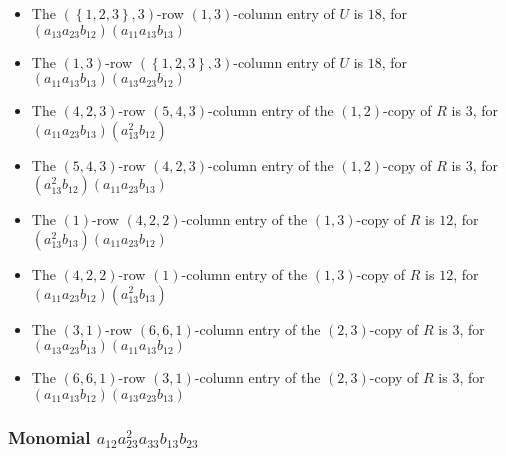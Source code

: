 \documentclass{article}
\begin{document}
\begin{itemize}
\item The $ \left(\left\{1, 2, 3\right\}, 3\right) $-row $ \left(1, 3\right) $-column entry of $U$ is $ 18 $, for $( a_{13} a_{23} b_{12} )( a_{11} a_{13} b_{13} )$ 
\item The $ \left(1, 3\right) $-row $ \left(\left\{1, 2, 3\right\}, 3\right) $-column entry of $U$ is $ 18 $, for $( a_{11} a_{13} b_{13} )( a_{13} a_{23} b_{12} )$ 
\item The $(4, 2, 3)$-row $(5, 4, 3)$-column entry of the $ \left(1, 2\right) $-copy of $R$ is $ 3 $, for $( a_{11} a_{23} b_{13} )( a_{13}^{2} b_{12} )$ 
\item The $(5, 4, 3)$-row $(4, 2, 3)$-column entry of the $ \left(1, 2\right) $-copy of $R$ is $ 3 $, for $( a_{13}^{2} b_{12} )( a_{11} a_{23} b_{13} )$ 
\item The $(1)$-row $(4, 2, 2)$-column entry of the $ \left(1, 3\right) $-copy of $R$ is $ 12 $, for $( a_{13}^{2} b_{13} )( a_{11} a_{23} b_{12} )$ 
\item The $(4, 2, 2)$-row $(1)$-column entry of the $ \left(1, 3\right) $-copy of $R$ is $ 12 $, for $( a_{11} a_{23} b_{12} )( a_{13}^{2} b_{13} )$ 
\item The $(3, 1)$-row $(6, 6, 1)$-column entry of the $ \left(2, 3\right) $-copy of $R$ is $ 3 $, for $( a_{13} a_{23} b_{13} )( a_{11} a_{13} b_{12} )$ 
\item The $(6, 6, 1)$-row $(3, 1)$-column entry of the $ \left(2, 3\right) $-copy of $R$ is $ 3 $, for $( a_{11} a_{13} b_{12} )( a_{13} a_{23} b_{13} )$ 
\end{itemize}
\subsubsection{Monomial $ a_{12} a_{23}^{2} a_{33} b_{13} b_{23} $}
\end{document}
